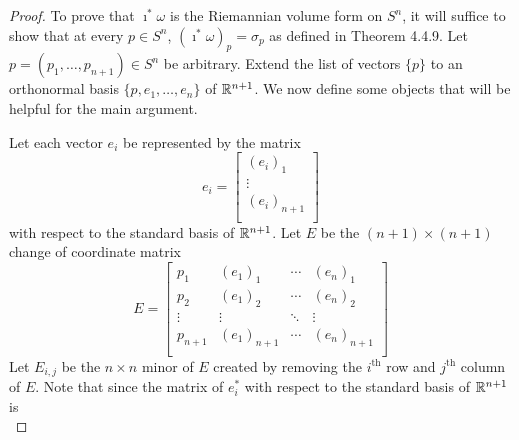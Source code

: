 \documentclass[../psets.tex]{subfiles}
\begin{document}
\begin{enumerate}[label={\textbf{4.4.\roman*.}}]
\begin{proof}




        To prove that $\imath^*\omega$ is the Riemannian volume form on $S^n$, it will suffice to show that at every $p\in S^n$, $(\imath^*\omega)_p=\sigma_p$ as defined in Theorem 4.4.9. Let $p=(p_1,\dots,p_{n+1})\in S^n$ be arbitrary. Extend the list of vectors $\{p\}$ to an orthonormal basis $\{p,e_1,\dots,e_n\}$ of $\mathbb{R}^{n+1}$. We now define some objects that will be helpful for the main argument.\par
        Let each vector $e_i$ be represented by the matrix
        \begin{equation*}
            e_i =
            \begin{bmatrix}
                (e_i)_1\\
                \vdots\\
                (e_i)_{n+1}\\
            \end{bmatrix}
        \end{equation*}
        with respect to the standard basis of $\mathbb{R}^{n+1}$. Let $E$ be the $(n+1)\times(n+1)$ change of coordinate matrix
        \begin{equation*}
            E =
            \begin{bmatrix}
                p_1 & (e_1)_1 & \cdots & (e_n)_1\\
                p_2 & (e_1)_2 & \cdots & (e_n)_2\\
                \vdots & \vdots & \ddots & \vdots\\
                p_{n+1} & (e_1)_{n+1} & \cdots & (e_n)_{n+1}\\
            \end{bmatrix}
        \end{equation*}
        Let $E_{i,j}$ be the $n\times n$ minor of $E$ created by removing the $i^\text{th}$ row and $j^\text{th}$ column of $E$. Note that since the matrix of $e_i^*$ with respect to the standard basis of $\mathbb{R}^{n+1}$ is
        \begin{equation*}

\end{equation*}
\end{proof}
\end{enumerate}
\end{document}
